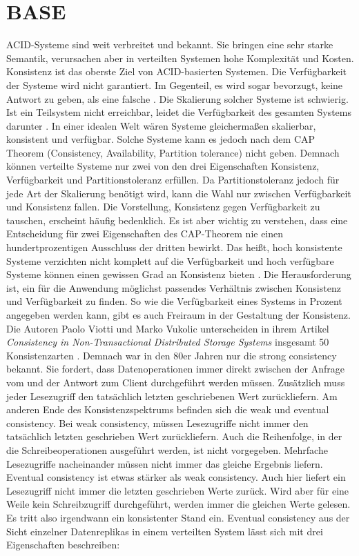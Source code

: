 \documentclass[12pt,oneside,a4paper,parskip]{scrbook}
\begin{document}
\section{BASE}
ACID-Systeme sind weit verbreitet und bekannt. Sie bringen eine sehr starke Semantik, verursachen aber in verteilten Systemen hohe Komplexität und Kosten. Konsistenz ist das oberste Ziel von ACID-basierten Systemen. Die Verfügbarkeit der Systeme wird nicht garantiert. Im Gegenteil, es wird sogar bevorzugt, keine Antwort zu geben, als eine falsche \cite{clusterBASE}. Die Skalierung solcher Systeme ist schwierig. Ist ein Teilsystem nicht erreichbar, leidet die Verfügbarkeit des gesamten Systems darunter \cite{BASE}. In einer idealen Welt wären Systeme gleichermaßen skalierbar, konsistent und verfügbar. Solche Systeme kann es jedoch nach dem CAP Theorem (Consistency, Availability, Partition tolerance) nicht geben. Demnach können verteilte Systeme nur zwei von den drei Eigenschaften Konsistenz, Verfügbarkeit und Partitionstoleranz erfüllen. Da Partitionstoleranz jedoch für jede Art der Skalierung benötigt wird, kann die Wahl nur zwischen Verfügbarkeit und Konsistenz fallen. Die Vorstellung, Konsistenz gegen Verfügbarkeit zu tauschen, erscheint häufig bedenklich. Es ist aber wichtig zu verstehen, dass eine Entscheidung für zwei Eigenschaften des CAP-Theorem nie einen hundertprozentigen Ausschluss der dritten bewirkt.
Das heißt, hoch konsistente Systeme verzichten nicht komplett auf die Verfügbarkeit und hoch verfügbare Systeme können einen gewissen Grad an Konsistenz bieten \cite{cap}. Die Herausforderung ist, ein für die Anwendung möglichst passendes Verhältnis zwischen Konsistenz und Verfügbarkeit zu finden. So wie die Verfügbarkeit eines Systems in Prozent angegeben werden kann, gibt es auch Freiraum in der Gestaltung der Konsistenz. Die Autoren Paolo Viotti und Marko Vukolic unterscheiden in ihrem Artikel \textit{Consistency in Non-Transactional Distributed Storage Systems} insgesamt 50 Konsistenzarten \cite{consistency}. Demnach war in den 80er Jahren nur die strong consistency bekannt. Sie fordert, dass Datenoperationen immer direkt zwischen der Anfrage vom und der Antwort zum Client durchgeführt werden müssen. Zusätzlich muss jeder Lesezugriff den tatsächlich letzten geschriebenen Wert zurückliefern. Am anderen Ende des Konsistenzspektrums befinden sich die weak und eventual consistency. Bei weak consistency, müssen Lesezugriffe nicht immer den tatsächlich letzten geschrieben Wert zurückliefern. Auch die Reihenfolge, in der die Schreibeoperationen ausgeführt werden, ist nicht vorgegeben. Mehrfache Lesezugriffe nacheinander müssen nicht immer das gleiche Ergebnis liefern. Eventual consistency ist etwas stärker als weak consistency. Auch hier liefert ein Lesezugriff nicht immer die letzten geschrieben Werte zurück. Wird aber für eine Weile kein Schreibzugriff durchgeführt, werden immer die gleichen Werte gelesen. Es tritt also irgendwann ein konsistenter Stand ein. Eventual consistency aus der Sicht einzelner Datenreplikas in einem verteilten System lässt sich mit drei Eigenschaften beschreiben:
\end{document}
